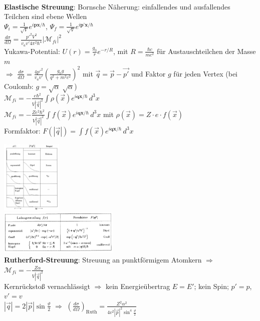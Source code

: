 \documentclass[10pt,twoside,a4paper]{article}
\begin{document}
\begin{multicols*}{3}
\ \\
\textbf{Elastische Streuung}: Bornsche Näherung: einfallendes und ausfallendes Teilchen sind ebene Wellen \\
$\Psi_i = \frac{1}{\sqrt{V}}e^{i\textbf{px} / \hbar}$, $\Psi_f = \frac{1}{\sqrt{V}}e^{i\textbf{p'x} / \hbar}$ \\
$\frac{d\sigma}{d\Omega} = \frac{p'^2 V^2}{v_a v' 4 \pi^2 \hbar^4} \left| \mathcal{M}_{fi} \right|^2$ \\
Yukawa-Potential: $U(r) = \frac{g_0}{r} e^{-r/R}$, mit $R = \frac{\hbar c}{m c^2}$ für Austauschteilchen der Masse $m$ \\
$\Rightarrow$ $\frac{d\sigma}{d\Omega} = \frac{4 p'^2}{v_a v'} \left( \frac{g_0 g}{q^2 + m^2 c^2} \right)^2$ mit $\vec{q} = \vec{p} - \vec{p'}$ und Faktor $g$ für jeden Vertex (bei Coulomb: $g = \sqrt{\alpha} \; \sqrt{\alpha}$) \\
$\mathcal{M}_{fi} = - \frac{e \hbar^2}{V \left| \vec{q} \right|^2} \int \rho\left( \vec{x} \right) e^{i \textbf{qx} / \hbar} \,d^3x$ \\
$\mathcal{M}_{fi} = - \frac{Z e^2 \hbar^2}{V \left| \vec{q} \right|^2} \int f\left( \vec{x} \right) e^{i \textbf{qx} / \hbar} \,d^3x$ mit $\rho\left( \vec{x} \right) = Z \cdot e \cdot f\left( \vec{x} \right)$ \\
Formfaktor: $F\left(\left|\vec{q}\right|\right) = \int f\left( \vec{x} \right) e^{i \textbf{qx} / \hbar} \,d^3x$

\includegraphics[width=.33\textwidth,height=100pt]{formfaktor1}\\
\includegraphics[width=.33\textwidth,height=60pt]{formfaktor2}\\


\textbf{Rutherford-Streuung}: Streuung an punktförmigem Atomkern $\Rightarrow$ $\mathcal{M}_{fi} = - \frac{Z \alpha}{V \left| \vec{q} \right|^2}$ \\
Kernrückstoß vernachlässigt $\Rightarrow$ kein Energieübertrag $E = E'$; kein Spin; $p' = p$, $v' = v$ \\
$\left| \vec{q} \right| = 2 \left| \vec{p} \right| \sin \frac{\vartheta}{2}$ $\Rightarrow$ $\left( \frac{d\sigma}{d\Omega} \right)_{\text{Ruth}} = \frac{Z^2 \alpha^2}{4 v^2 \left| \vec{p} \right|^2 \sin^4 \frac{\vartheta}{2}}$


\end{multicols*}
\end{document}
